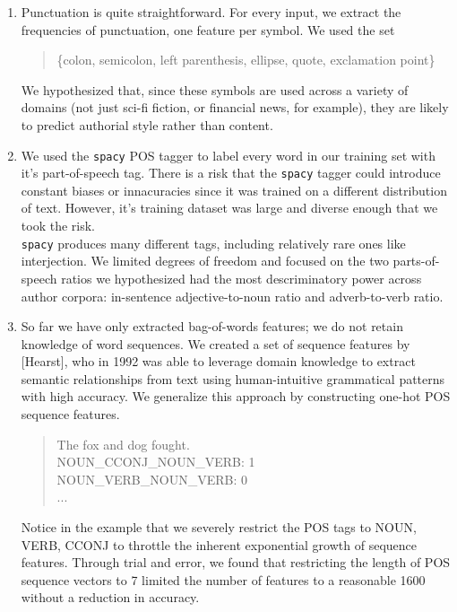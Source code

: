 \documentclass[12pt]{article}
\begin{document}
\begin{enumerate}
  \item Punctuation is quite straightforward. For every input, we extract the frequencies of punctuation, one feature per symbol. We used the set 
  \begin{quote} \{colon, semicolon, left parenthesis, ellipse, quote, exclamation point\}
  \end{quote} 
  We hypothesized that, since these symbols are used across a variety of domains (not just sci-fi fiction, or financial news, for example), they are likely to predict authorial style rather than content.
  \item We used the \texttt{spacy} POS tagger to label every word in our training set with it's part-of-speech tag. There is a risk that the \texttt{spacy} tagger could introduce constant biases or innacuracies since it was trained on a different distribution of text. However, it's training dataset was large and diverse enough that we took the risk.
  \\
  \texttt{spacy} produces many different tags, including relatively rare ones like interjection. We limited degrees of freedom and focused on the two parts-of-speech ratios we hypothesized had the most descriminatory power across author corpora: in-sentence adjective-to-noun ratio and adverb-to-verb ratio.
  \item So far we have only extracted bag-of-words features; we do not retain knowledge of word sequences. We created a set of sequence features by [Hearst], who in 1992 was able to leverage domain knowledge to extract semantic relationships from text using human-intuitive grammatical patterns with high accuracy. We generalize this approach by constructing one-hot POS sequence features. 

  \begin{quote}
  The fox and dog fought. \\
  NOUN\_CCONJ\_NOUN\_VERB: 1\\
  NOUN\_VERB\_NOUN\_VERB: 0\\
  ...
  \end{quote}

  Notice in the example that we severely restrict the POS tags to NOUN, VERB, CCONJ to throttle the inherent exponential growth of sequence features. Through trial and error, we found that restricting the length of POS sequence vectors to 7 limited the number of features to a reasonable 1600 without a reduction in accuracy.
\end{enumerate}
\end{document}
